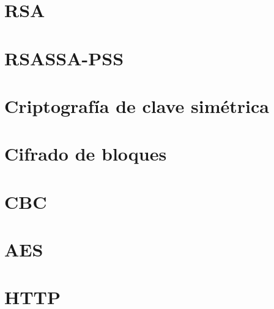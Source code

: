  \section{RSA}


 \section{RSASSA-PSS}


 \section{Criptografía de clave simétrica}


 \section{Cifrado de bloques}


 \section{CBC}


 \section{AES}


 \section{HTTP}
